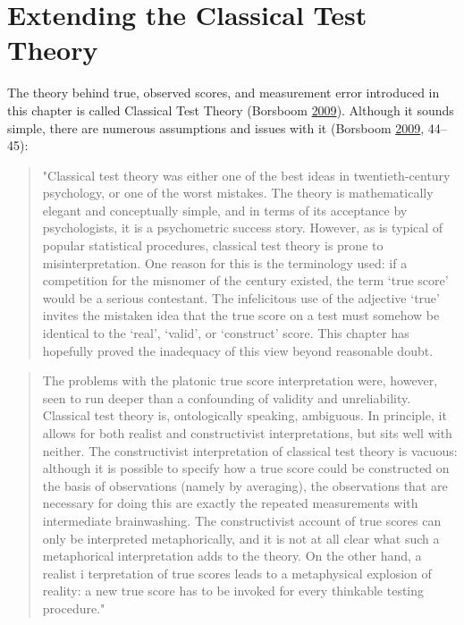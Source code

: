 \documentclass[
]{book}
\begin{document}
\hypertarget{extending-the-classical-test-theory}{%
\section{Extending the Classical Test Theory}\label{extending-the-classical-test-theory}}

The theory behind true, observed scores, and measurement error introduced in this chapter is called Classical Test Theory (Borsboom \protect\hyperlink{ref-borsboomMeasuringMindConceptual2009}{2009}). Although it sounds simple, there are numerous assumptions and issues with it (Borsboom \protect\hyperlink{ref-borsboomMeasuringMindConceptual2009}{2009}, 44--45):

\begin{quote}
"Classical test theory was either one of the best ideas in twentieth-century psychology, or one of the worst mistakes. The theory is mathematically elegant and conceptually simple, and in terms of its acceptance by psychologists, it is a psychometric success story. However, as is typical of popular statistical procedures, classical test theory is prone to misinterpretation. One reason for this is the terminology used: if a competition for the misnomer of the century existed, the term `true score' would be a serious contestant. The infelicitous use of the adjective `true' invites the mistaken idea that the true score on a test must somehow be identical to the `real', `valid', or `construct' score. This chapter has hopefully proved the inadequacy of this view beyond reasonable doubt.
\end{quote}

\begin{quote}
The problems with the platonic true score interpretation were, however, seen to run deeper than a confounding of validity and unreliability. Classical test theory is, ontologically speaking, ambiguous. In principle, it allows for both realist and constructivist interpretations, but sits well with neither. The constructivist interpretation of classical test theory is vacuous: although it is possible to specify how a true score could be constructed on the basis of observations (namely by averaging), the observations that are necessary for doing this are exactly the repeated measurements with intermediate brainwashing. The constructivist account of true scores can only be interpreted metaphorically, and it is not at all clear what such a metaphorical interpretation adds to the theory. On the other hand, a realist i terpretation of true scores leads to a metaphysical explosion of reality: a new true score has to be invoked for every thinkable testing procedure."
\end{quote}
\end{document}
